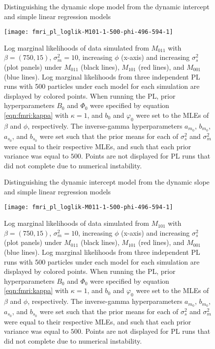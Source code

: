 \begin{figure}
\ssp
\centering
\caption{Distinguishing the dynamic slope model from the dynamic intercept and simple linear regression models} \label{fig:fmri:phi:M011}
\texttt{[image: fmri\_pl\_loglik-M101-1-500-phi-496-594-1]}
\caption*{Log marginal likelihoods of data simulated from $M_{011}$ with $\beta=(750,15)$, $\sigma^2_m = 10$, increasing $\phi$ (x-axis) and increasing $\sigma^2_s$ (plot panels) under $M_{011}$ (black lines), $M_{101}$ (red lines), and $M_{001}$ (blue lines). Log marginal likelihoods from three independent PL runs with 500 particles under each model for each simulation are displayed by colored points. When running the PL, prior hyperparameters $B_0$ and $\Phi_0$ were specified by equation \eqref{eqn:fmri:kappa} with $\kappa = 1$, and $b_0$ and $\varphi_0$ were set to the MLEs of $\beta$ and $\phi$, respectively. The inverse-gamma hyperparameters $a_{m_0}$, $b_{m_0}$, $a_{s_0}$, and $b_{s_0}$ were set such that the prior means for each of $\sigma^2_s$ and $\sigma^2_m$ were equal to their respective MLEs, and such that each prior variance was equal to $500$. Points are not displayed for PL runs that did not complete due to numerical instability.}
\end{figure}

\begin{figure}
\ssp
\centering
\caption{Distinguishing the dynamic intercept model from the dynamic slope and simple linear regression models} \label{fig:fmri:phi:M101}
\texttt{[image: fmri\_pl\_loglik-M011-1-500-phi-496-594-1]}
\caption*{Log marginal likelihoods of data simulated from $M_{101}$ with $\beta=(750,15)$, $\sigma^2_m = 10$, increasing $\phi$ (x-axis) and increasing $\sigma^2_s$ (plot panels) under $M_{011}$ (black lines), $M_{101}$ (red lines), and $M_{001}$ (blue lines). Log marginal likelihoods from three independent PL runs with 500 particles under each model for each simulation are displayed by colored points. When running the PL, prior hyperparameters $B_0$ and $\Phi_0$ were specified by equation \eqref{eqn:fmri:kappa} with $\kappa = 1$, and $b_0$ and $\varphi_0$ were set to the MLEs of $\beta$ and $\phi$, respectively. The inverse-gamma hyperparameters $a_{m_0}$, $b_{m_0}$, $a_{s_0}$, and $b_{s_0}$ were set such that the prior means for each of $\sigma^2_s$ and $\sigma^2_m$ were equal to their respective MLEs, and such that each prior variance was equal to $500$. Points are not displayed for PL runs that did not complete due to numerical instability.}
\end{figure}

